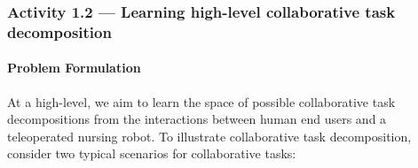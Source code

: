 \documentclass[letterpaper, 11 pt, onecolumn]{article}
\newcommand{\zhi}[1]{\textcolor{blue}{ZL: #1}}
\newcommand{\jie}[1]{\textcolor{green}{JF: #1}}
\begin{document}
\begin{itemize}


\end{itemize}








\subsubsection{Activity 1.2 --- Learning high-level collaborative task decomposition}\label{sec:plan-motion-high}

\paragraph*{Problem Formulation} At a high-level, we aim to learn the space of possible collaborative task decompositions from the interactions between human end users and a teleoperated nursing robot. To illustrate collaborative task decomposition, consider two typical scenarios for collaborative tasks: 
\end{document}
